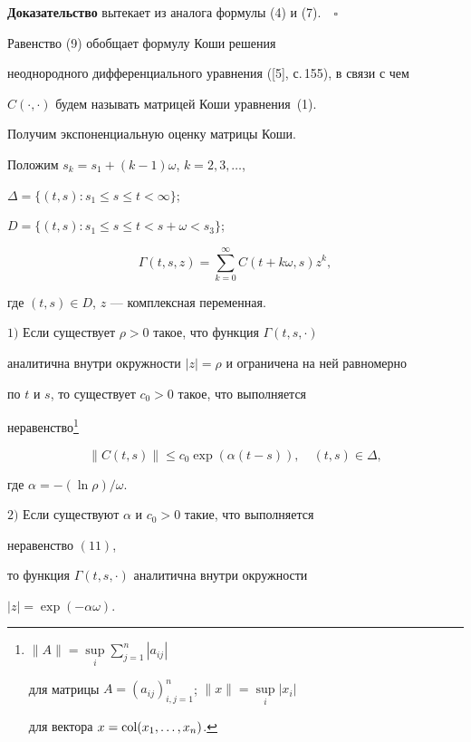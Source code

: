 {\bf Доказательство} вытекает из аналога формулы (4) и (7).$\quad\square$





\begin{notenonum}


Равенство (9) обобщает формулу Коши решения


неоднородного дифференциального уравнения ([5], с.\,155), в связи с чем


$C(\cdot,\cdot)$ будем называть матрицей Коши уравнения~(1).


\end{notenonum}





Получим экспоненциальную оценку матрицы Коши.


Положим $s_k= s_1+(k-1)\omega$, $k=2,3,\dotsc$,


$\Delta=\{(t,s):s_1\le s\le t<\infty\}$;


$D=\{(t,s):s_1\le s\le t<{s+\omega}<s_3\}$;


\begin{equation}


\Gamma(t,s,z)=\sum\limits_{k=0}^\infty C(t+k\omega,s)z^k,


\end{equation}


где $(t,s)\in D$, $z$ --- комплексная переменная.








\begin{thm}


$1)$ Если существует $\rho>0$ такое, что функция $\Gamma(t,s,\cdot)$ 


аналитична внутри окружности $|z|=\rho$ и ограничена на ней равномерно 


по $t$ и $s$, то существует $c_0>0$ такое, что выполняется 


неравенство\footnote{$\|A\|=\sup\limits_i\sum\limits_{j=1}^n|a_{ij}|$


для матрицы $A=(a_{ij})_{i,j=1}^n$; $\|x\|=\sup\limits_i|x_i|$


для вектора $x=\operatorname{col}(x_1,\dotsc,x_n)$.}


\begin{equation}


\| C(t,s)\|\le c_0 \exp(\alpha(t-s)), \quad (t,s)\in\Delta,


\end{equation}


где $\alpha=-(\ln\rho)/\omega$.





$2)$ Если существуют $\alpha$ и $c_0>0$ такие, что выполняется 


неравенство $(11)$,


то функция $\Gamma(t,s,\cdot)$ аналитична внутри окружности


$|z|=\exp(-\alpha\omega)$.


\end{thm}


